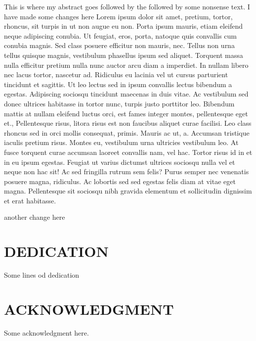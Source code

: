 \documentclass{source/tex/templates/maththesis}
\begin{document}
This is where my abstract goes followed by the followed by some nonsense text. I have made some changes here Lorem ipsum dolor sit amet, pretium, tortor, rhoncus, sit turpis in ut non augue eu non. Porta ipsum mauris, etiam eleifend neque adipiscing conubia. Ut feugiat, eros, porta, natoque quis convallis cum conubia magnis. Sed class posuere efficitur non mauris, nec. Tellus non urna tellus quisque magnis, vestibulum phasellus ipsum sed aliquet. Torquent massa nulla efficitur pretium nulla nunc auctor arcu diam a imperdiet. In nullam libero nec lacus tortor, nascetur ad. Ridiculus eu lacinia vel ut cursus parturient tincidunt et sagittis. Ut leo lectus sed in ipsum convallis lectus bibendum a egestas. Adipiscing sociosqu tincidunt maecenas in duis vitae. Ac vestibulum sed donec ultrices habitasse in tortor nunc, turpis justo porttitor leo. Bibendum mattis at nullam eleifend luctus orci, est fames integer montes, pellentesque eget et., Pellentesque risus, litora risus est non faucibus aliquet curae facilisi. Leo class rhoncus sed in orci mollis consequat, primis. Mauris ac ut, a. Accumsan tristique iaculis pretium risus. Montes eu, vestibulum urna ultricies vestibulum leo. At fusce torquent curae accumsan laoreet convallis nam, vel hac. Tortor risus id in et in eu ipsum egestas. Feugiat ut varius dictumst ultrices sociosqu nulla vel et neque non hac sit! Ac sed fringilla rutrum sem felis? Purus semper nec venenatis posuere magna, ridiculus. Ac lobortis sed sed egestas felis diam at vitae eget magna. Pellentesque sit sociosqu nibh gravida elementum et sollicitudin dignissim et erat habitasse.

another change here

\hypertarget{dedication}{%
\chapter*{DEDICATION}\label{dedication}}

Some lines od dedication

\hypertarget{acknowledgment}{%
\chapter*{ACKNOWLEDGMENT}\label{acknowledgment}}

Some acknowledgment here.

\tableofcontents
{}
\end{document}
